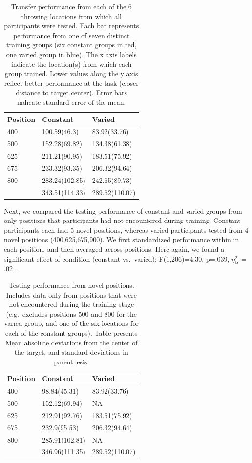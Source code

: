 \documentclass[
  jou, donotrepeattitle,floatsintext]{apa7}
\begin{document}
\begin{table}

\caption{\label{tab:e2table1}Transfer performance from each of the 6 throwing locations from which all participants were tested. Each bar represents performance from one of seven distinct training groups (six constant groups in red, one varied group in blue). The x axis labels indicate the location(s) from which each group trained. Lower values along the y axis reflect better performance at the task (closer distance to target center). Error bars indicate standard error of the mean.}
\begin{tabular}[t]{lll}
\toprule
Position & Constant & Varied\\
\midrule
400 & 100.59(46.3) & 83.92(33.76)\\
500 & 152.28(69.82) & 134.38(61.38)\\
625 & 211.21(90.95) & 183.51(75.92)\\
675 & 233.32(93.35) & 206.32(94.64)\\
800 & 283.24(102.85) & 242.65(89.73)\\
\addlinespace
900 & 343.51(114.33) & 289.62(110.07)\\
\bottomrule
\end{tabular}
\end{table}

Next, we compared the testing performance of constant and varied groups from only positions that participants had not encountered during training. Constant participants each had 5 novel positions, whereas varied participants tested from 4 novel positions (400,625,675,900). We first standardized performance within in each position, and then averaged across positions. Here again, we found a significant effect of condition (constant vs.~varied): F(1,206)=4.30, p=.039, \(\eta^{2}_G\) = .02 .



\begin{table}

\caption{\label{tab:e2table3}Testing performance from novel positions. Includes data only from positions that were not encountered during the training stage (e.g.~excludes positions 500 and 800 for the varied group, and one of the six locations for each of the constant groups). Table presents Mean absolute deviations from the center of the target, and standard deviations in parenthesis.}
\begin{tabular}[t]{lll}
\toprule
Position & Constant & Varied\\
\midrule
400 & 98.84(45.31) & 83.92(33.76)\\
500 & 152.12(69.94) & NA\\
625 & 212.91(92.76) & 183.51(75.92)\\
675 & 232.9(95.53) & 206.32(94.64)\\
800 & 285.91(102.81) & NA\\
\addlinespace
900 & 346.96(111.35) & 289.62(110.07)\\
\bottomrule
\end{tabular}
\end{table}
\end{document}
